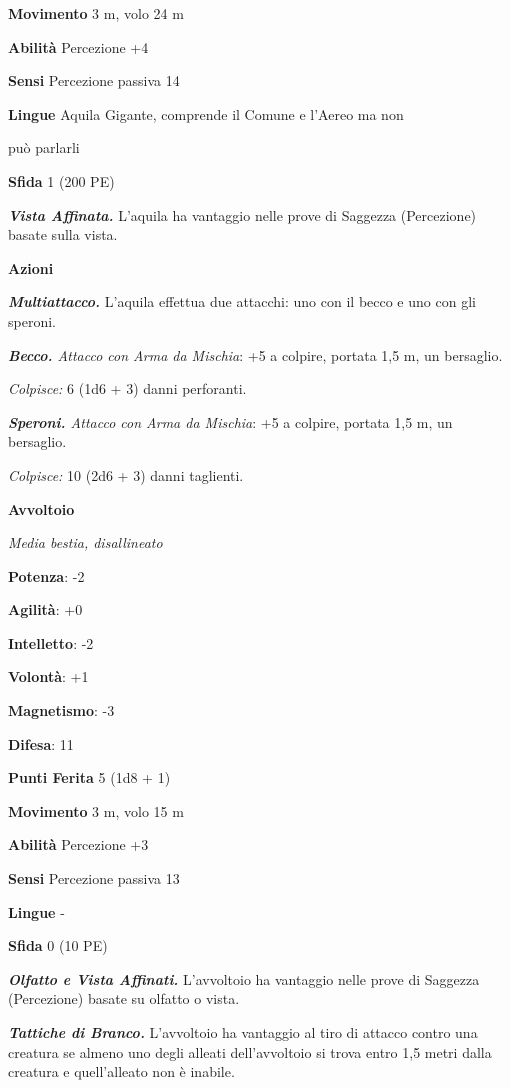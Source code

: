 \begin{multicols}{2}
\textbf{Movimento} 3 m, volo 24 m

\textbf{Abilità} Percezione +4

\textbf{Sensi} Percezione passiva 14

\textbf{Lingue} Aquila Gigante, comprende il Comune e l'Aereo ma non

può parlarli

\textbf{Sfida} 1 (200 PE)

\emph{\textbf{Vista Affinata.}} L'aquila ha vantaggio nelle prove di
Saggezza (Percezione) basate sulla vista.

\textbf{Azioni}

\emph{\textbf{Multiattacco.}} L'aquila effettua due attacchi: uno con il
becco e uno con gli speroni.

\emph{\textbf{Becco.} Attacco con Arma da Mischia}: +5 a colpire,
portata 1,5 m, un bersaglio.

\emph{Colpisce:} 6 (1d6 + 3) danni perforanti.

\emph{\textbf{Speroni.} Attacco con Arma da Mischia}: +5 a colpire,
portata 1,5 m, un bersaglio.

\emph{Colpisce:} 10 (2d6 + 3) danni taglienti.

\textbf{Avvoltoio}

\emph{Media bestia, disallineato}

\textbf{Potenza}: -2

\textbf{Agilità}: +0

\textbf{Intelletto}: -2

\textbf{Volontà}: +1

\textbf{Magnetismo}: -3

\textbf{Difesa}: 11

\textbf{Punti Ferita} 5 (1d8 + 1)

\textbf{Movimento} 3 m, volo 15 m

\textbf{Abilità} Percezione +3

\textbf{Sensi} Percezione passiva 13

\textbf{Lingue} -

\textbf{Sfida} 0 (10 PE)

\emph{\textbf{Olfatto e Vista Affinati.}} L'avvoltoio ha vantaggio nelle
prove di Saggezza (Percezione) basate su olfatto o vista.

\emph{\textbf{Tattiche di Branco.}} L'avvoltoio ha vantaggio al tiro di
attacco contro una creatura se almeno uno degli alleati dell'avvoltoio
si trova entro 1,5 metri dalla creatura e quell'alleato non è inabile.


\end{multicols}

